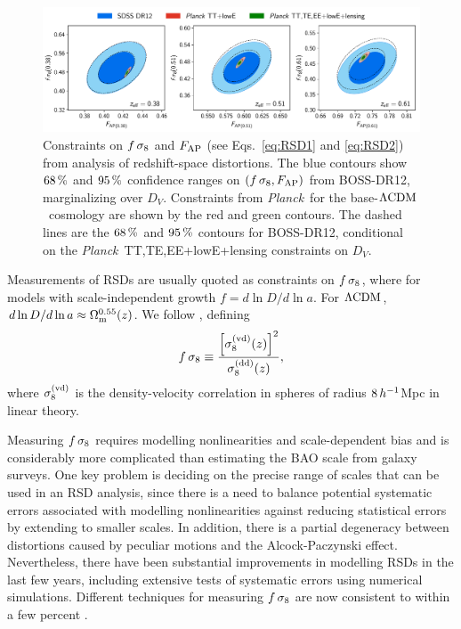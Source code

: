 \documentclass[longauth,traditabstract]{aa}
\def\Planck{\textit{Planck}}
\def\,{\thinspace}
\newcommand{\mksym}[1]{\ifmmode {\rm #1}\else #1\fi}
\newcommand{\dataplus}{\allowbreak+}
\newcommand{\TTTEEE}{\mksym{TT,TE,EE}}
\newcommand{\planckTTTEEEonly}{\planck\ \TTTEEE}
\newcommand{\lowE}{\mksym{lowE}}
\newcommand{\planckall}{\planckTTTEEEonly\dataplus\lowE}
\providecommand{\LCDM}{{$\rm{\Lambda CDM}$}}
\newcommand{\paramsII}{\citetalias{planck2014-a15}}
\newcommand{\planck}{\Planck}
\begin{document}
\begin{figure}
\begin{center}
\includegraphics[width=165mm,angle=0]{fsig8-FAP.pdf}
\end{center}
\caption {Constraints on $f\, \sigma_8$ and $F_{\rm AP}$ (see Eqs.~\ref{eq:RSD1} and \ref{eq:RSD2}) from
analysis of redshift-space distortions.
The blue contours show $68\,\%$ and $95\,\%$ confidence ranges on $(f\,\sigma_8, F_{\rm AP})$ from BOSS-DR12,
marginalizing over $D_V$. Constraints from \Planck\ for the base-\LCDM\ cosmology are shown by the red and green contours.
The dashed lines are the $68\,\%$ and $95\,\%$ contours for BOSS-DR12, conditional on the \planckall+lensing constraints on
$D_V$. }
\label{fig:fsig8FAP}
\end{figure}

Measurements of RSDs are usually quoted as constraints on $f\,\sigma_8$,
where for models with scale-independent growth
$f=d\ln D/d\ln a$. For \LCDM, $d\ln D/d\ln a\approx\Omega_{\rm m}^{0.55}(z)$.
 We follow \paramsII, defining
\begin{equation}
  f\,\sigma_8 \equiv \frac{\left[\sigma_8^{\rm (vd)}(z)\right]^2}
                          {      \sigma_8^{\rm (dd)}(z)},
\label{eq:RSD1}
\end{equation}
where $\sigma_8^{\rm (vd)}$ is the density-velocity correlation in spheres
of radius $8\,h^{-1}$Mpc in linear theory.

Measuring $f\,\sigma_8$ requires modelling nonlinearities and
scale-dependent bias and is considerably more complicated than
estimating the BAO scale from galaxy surveys. One key problem is
deciding on the precise range of scales that can be used in an RSD
analysis, since there is a need to balance potential systematic errors
associated with modelling nonlinearities against reducing statistical
errors by extending to smaller scales. In addition, there is a partial
degeneracy between distortions caused by peculiar motions and the
Alcock-Paczynski effect. Nevertheless, there have been substantial improvements in
modelling RSDs in the last few years, including extensive tests of systematic
errors using numerical simulations. Different techniques for measuring $f\,\sigma_8$
are now consistent to within a few percent \citep{Alam:2016hwk}.
\end{document}
